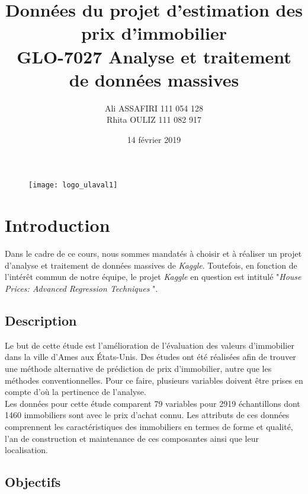 \documentclass[12pt]{extarticle}
\title{Données du projet d'estimation des prix d'immobilier \\ \large{ GLO-7027 Analyse et traitement de données massives}}
\author{Ali ASSAFIRI 111 054 128 \\ Rhita OULIZ  111 082 917 }
\date{14 février 2019}
\begin{document}
 \begin{figure}[t]
\texttt{[image: logo\_ulaval1]}
\centering
\end{figure}



\begin{titlepage}
\maketitle
\thispagestyle{empty}
\end{titlepage}
 
\maketitle
 

\vspace{2cm} %
 
\section{Introduction}
 
Dans le cadre de ce cours, nous sommes mandatés à choisir et à réaliser un projet d’analyse et traitement de données massives de \emph{Kaggle}. Toutefois, en fonction de l’intérêt commun de notre équipe, le projet \emph{Kaggle} en question est intitulé  "\emph{House Prices: Advanced Regression Techniques} ". 

\subsection{Description}
 
Le but de cette étude est l’amélioration de l’évaluation des valeurs d’immobilier dans la ville d’Ames aux États-Unis. Des études ont été réalisées afin de trouver une méthode alternative de prédiction de prix d’immobilier, autre que les méthodes conventionnelles. Pour ce faire, plusieurs variables doivent être prises en compte d’où la pertinence de l’analyse.  \\
Les données pour cette étude comparent 79 variables pour 2919 échantillons dont 1460 immobiliers sont avec le prix d’achat connu. Les attributs de ces données comprennent les caractéristiques des immobiliers en termes de forme et qualité, l’an de construction et maintenance de ces composantes ainsi que leur localisation. 

\subsection{Objectifs}
 
\end{document}

